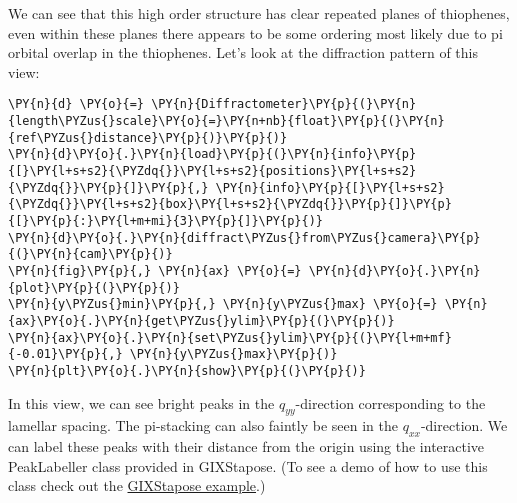             
    
    \begin{center}
    \end{center}
    

    We can see that this high order structure has clear repeated planes of
thiophenes, even within these planes there appears to be some ordering
most likely due to pi orbital overlap in the thiophenes. Let's look at
the diffraction pattern of this view:

    \begin{tcolorbox}[breakable, size=fbox, boxrule=1pt, pad at break*=1mm,colback=cellbackground, colframe=cellborder]
\begin{Verbatim}[commandchars=\\\{\}]
\PY{n}{d} \PY{o}{=} \PY{n}{Diffractometer}\PY{p}{(}\PY{n}{length\PYZus{}scale}\PY{o}{=}\PY{n+nb}{float}\PY{p}{(}\PY{n}{ref\PYZus{}distance}\PY{p}{)}\PY{p}{)}
\PY{n}{d}\PY{o}{.}\PY{n}{load}\PY{p}{(}\PY{n}{info}\PY{p}{[}\PY{l+s+s2}{\PYZdq{}}\PY{l+s+s2}{positions}\PY{l+s+s2}{\PYZdq{}}\PY{p}{]}\PY{p}{,} \PY{n}{info}\PY{p}{[}\PY{l+s+s2}{\PYZdq{}}\PY{l+s+s2}{box}\PY{l+s+s2}{\PYZdq{}}\PY{p}{]}\PY{p}{[}\PY{p}{:}\PY{l+m+mi}{3}\PY{p}{]}\PY{p}{)}
\PY{n}{d}\PY{o}{.}\PY{n}{diffract\PYZus{}from\PYZus{}camera}\PY{p}{(}\PY{n}{cam}\PY{p}{)}
\PY{n}{fig}\PY{p}{,} \PY{n}{ax} \PY{o}{=} \PY{n}{d}\PY{o}{.}\PY{n}{plot}\PY{p}{(}\PY{p}{)}
\PY{n}{y\PYZus{}min}\PY{p}{,} \PY{n}{y\PYZus{}max} \PY{o}{=} \PY{n}{ax}\PY{o}{.}\PY{n}{get\PYZus{}ylim}\PY{p}{(}\PY{p}{)}
\PY{n}{ax}\PY{o}{.}\PY{n}{set\PYZus{}ylim}\PY{p}{(}\PY{l+m+mf}{-0.01}\PY{p}{,} \PY{n}{y\PYZus{}max}\PY{p}{)}
\PY{n}{plt}\PY{o}{.}\PY{n}{show}\PY{p}{(}\PY{p}{)}
\end{Verbatim}
\end{tcolorbox}

    \begin{center}
    \end{center}
    
    In this view, we can see bright peaks in the \(q_{yy}\)-direction
corresponding to the lamellar spacing. The pi-stacking can also faintly
be seen in the \(q_{xx}\)-direction. We can label these peaks with their
distance from the origin using the interactive PeakLabeller class
provided in GIXStapose. (To see a demo of how to use this class check
out the
\href{https://github.com/cmelab/GIXStapose/blob/master/examples/Figure_Example.ipynb}{GIXStapose
example}.)

